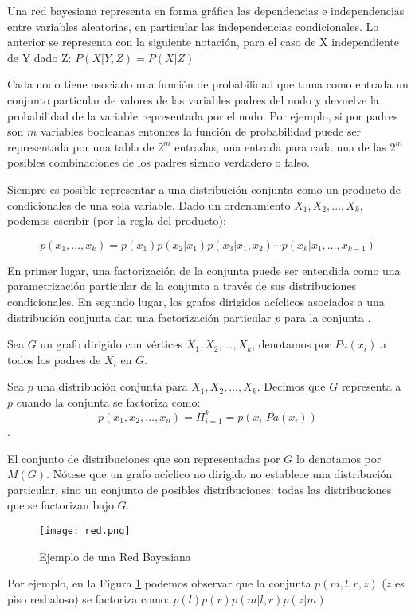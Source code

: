 Una red bayesiana representa en forma gr\'{a}fica las dependencias e independencias entre variables aleatorias, en particular las independencias condicionales. Lo anterior se representa con la siguiente notaci\'{o}n, para el caso de X independiente de Y dado Z: $P(X|Y,Z)=P(X|Z)$

Cada nodo tiene asociado una función de probabilidad que toma como entrada un conjunto particular de valores de las variables padres del nodo y devuelve la probabilidad de la variable representada por el nodo. Por ejemplo, si por padres son $m$ variables booleanas entonces la función de probabilidad puede ser representada por una tabla de $2^m$ entradas, una entrada para cada una de las $2^m$ posibles combinaciones de los padres siendo verdadero o falso.

Siempre es posible representar a una distribuci\'{o}n conjunta como un producto de condicionales de una sola variable. Dado un ordenamiento $X_1,X_2,…,X_k$, podemos escribir (por la regla del producto):

$$p(x_1, \ldots ,x_k)=p(x_1)p(x_2|x_1)p(x_3|x_1,x_2) \cdots p(x_k|x_1,\ldots ,x_{k-1})$$

En primer lugar, una factorizaci\'{o}n de la conjunta puede ser entendida como una parametrizaci\'{o}n particular de la conjunta a trav\'{e}s de sus distribuciones condicionales. En segundo lugar, los grafos dirigidos ac\'{i}clicos asociados a una distribuci\'{o}n conjunta dan una factorizaci\'{o}n particular $p$ para la conjunta \cite{koller2009probabilistic}.

Sea $G$ un grafo dirigido con v\'{e}rtices $X_1,X_2,\ldots,X_k$, denotamos por $Pa(x_i)$ a todos los padres de $X_i$ en $G$.

Sea $p$ una distribuci\'{o}n conjunta para $X_1,X_2,\ldots,X_k$. Decimos que $G$ representa a $p$ cuando la conjunta se factoriza como:
$$p(x_1,x_2,\ldots,x_n)= \Pi^k_{i=1}=p(x_i|Pa(x_i))$$.

El conjunto de distribuciones que son representadas por $G$ lo denotamos por $M(G)$. N\'{o}tese que un grafo ac\'{i}clico no dirigido no establece una distribuci\'{o}n particular, sino un conjunto de posibles distribuciones: todas las distribuciones que se factorizan bajo $G$.
\begin{figure}[h]
\caption{Ejemplo de una Red Bayesiana}
\centering
\texttt{[image: red.png]}
\label{fig:red1}
\end{figure}

Por ejemplo, en la Figura \ref{fig:red1} podemos observar que la conjunta $p(m,l,r,z)$ ($z$ es piso resbaloso) se factoriza como: $p(l)p(r)p(m|l,r)p(z|m)$

